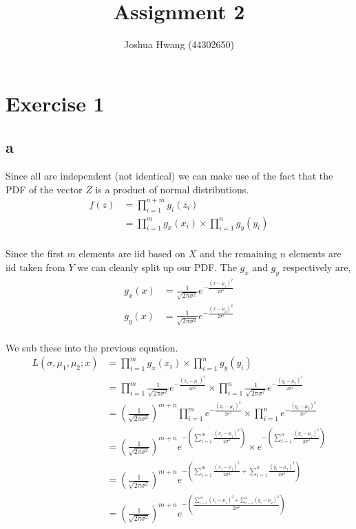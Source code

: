 \documentclass{article}
\title{Assignment 2}
\author{Joshua Hwang (44302650)}
\begin{document}
\section{Exercise 1}
\subsection{a}
Since all are independent (not identical) we can make use of the fact that the
PDF of the vector $Z$ is a product of normal distributions.
\begin{align*}
    f(z) &= \prod_{i=1}^{n+m} g_i (z_i) \\
    &= \prod_{i=1}^m g_x (x_i) \times \prod_{i=1}^n g_y (y_i) \\
\end{align*}

Since the first $m$ elements are iid based on $X$ and the remaining $n$ elements
are iid taken from $Y$ we can cleanly split up our PDF\@. The $g_x$ and $g_y$
respectively are,
\begin{align*}
    g_x(x) &= \frac{1}{\sqrt{2\pi\sigma^2}} e^{-\frac{{(x-\mu_1)}^2}{2\sigma^2}} \\
    g_y (x) &= \frac{1}{\sqrt{2\pi\sigma^2}} e^{-\frac{{(x-\mu_2)}^2}{2\sigma^2}} \\
\end{align*}

We sub these into the previous equation.
\begin{align*}
    L(\sigma, \mu_1, \mu_2;x) &= \prod_{i=1}^m g_x (x_i) \times \prod_{i=1}^n g_y (y_i) \\
    &= \prod_{i=1}^m \frac{1}{\sqrt{2\pi\sigma^2}} e^{-\frac{{(x_i-\mu_1)}^2}{2\sigma^2}}
    \times \prod_{i=1}^n \frac{1}{\sqrt{2\pi\sigma^2}} e^{-\frac{{(y_i-\mu_2)}^2}{2\sigma^2}} \\
    &= {\left(\frac{1}{\sqrt{2\pi\sigma^2}}\right)}^{m+n}
    \prod_{i=1}^m e^{-\frac{{(x_i-\mu_1)}^2}{2\sigma^2}}
    \times \prod_{i=1}^n e^{-\frac{{(y_i-\mu_2)}^2}{2\sigma^2}} \\
    &= {\left(\frac{1}{\sqrt{2\pi\sigma^2}}\right)}^{m+n}
    e^{-\left(\sum_{i=1}^m \frac{{(x_i-\mu_1)}^2}{2\sigma^2}\right)}
    \times e^{-\left(\sum_{i=1}^n \frac{{(y_i-\mu_2)}^2}{2\sigma^2}\right)} \\
    &= {\left(\frac{1}{\sqrt{2\pi\sigma^2}}\right)}^{m+n}
    e^{-\left(\sum_{i=1}^m \frac{{(x_i-\mu_1)}^2}{2\sigma^2}
    + \sum_{i=1}^n \frac{{(y_i-\mu_2)}^2}{2\sigma^2}\right)} \\
    &= {\left(\frac{1}{\sqrt{2\pi\sigma^2}}\right)}^{m+n}
    e^{-\left(\frac{{\sum_{i=1}^m (x_i-\mu_1)}^2 + {\sum_{i=1}^n (y_i-\mu_2)}^2}
    {2\sigma^2}\right)} \\
\end{align*}
\end{document}
